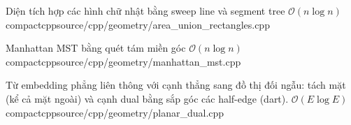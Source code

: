 {Diện tích hợp các hình chữ nhật bằng sweep line và segment tree}
{$\mathcal{O}(n \log n)$}
{compactcpp}{source/cpp/geometry/area_union_rectangles.cpp}

{Manhattan MST bằng quét tám miền góc}
{$\mathcal{O}(n \log n)$}
{compactcpp}{source/cpp/geometry/manhattan_mst.cpp}

{Từ embedding phẳng liên thông với cạnh thẳng sang đồ thị đối ngẫu: tách mặt (kể cả mặt ngoài) và cạnh dual bằng sắp góc các half-edge (dart).}
{$\mathcal{O}(E \log E)$}
{compactcpp}{source/cpp/geometry/planar_dual.cpp}
